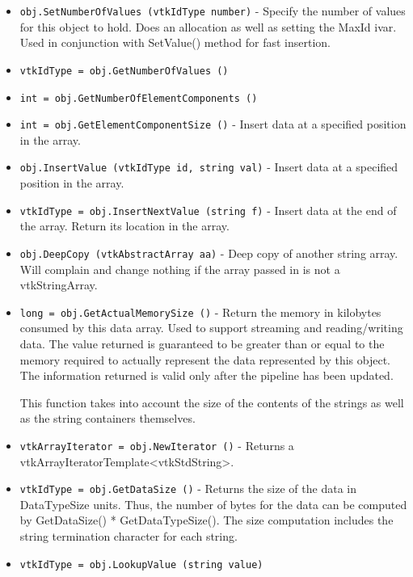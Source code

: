 \begin{itemize}
\item  \verb|obj.SetNumberOfValues (vtkIdType number)| -  Specify the number of values for this object to hold. Does an
 allocation as well as setting the MaxId ivar. Used in conjunction with
 SetValue() method for fast insertion.

\item  \verb|vtkIdType = obj.GetNumberOfValues ()|

\item  \verb|int = obj.GetNumberOfElementComponents ()|

\item  \verb|int = obj.GetElementComponentSize ()| -  Insert data at a specified position in the array.

\item  \verb|obj.InsertValue (vtkIdType id, string val)| -  Insert data at a specified position in the array.

\item  \verb|vtkIdType = obj.InsertNextValue (string f)| -  Insert data at the end of the array. Return its location in the array.

\item  \verb|obj.DeepCopy (vtkAbstractArray aa)| -  Deep copy of another string array.  Will complain and change nothing
 if the array passed in is not a vtkStringArray.

\item  \verb|long = obj.GetActualMemorySize ()| -  Return the memory in kilobytes consumed by this data array. Used to
 support streaming and reading/writing data. The value returned is
 guaranteed to be greater than or equal to the memory required to
 actually represent the data represented by this object. The 
 information returned is valid only after the pipeline has 
 been updated.

 This function takes into account the size of the contents of the
 strings as well as the string containers themselves.

\item  \verb|vtkArrayIterator = obj.NewIterator ()| -  Returns a vtkArrayIteratorTemplate<vtkStdString>.

\item  \verb|vtkIdType = obj.GetDataSize ()| -  Returns the size of the data in DataTypeSize units. Thus, the number of bytes
 for the data can be computed by GetDataSize() * GetDataTypeSize().
 The size computation includes the string termination character for each string.

\item  \verb|vtkIdType = obj.LookupValue (string value)|


\end{itemize}
